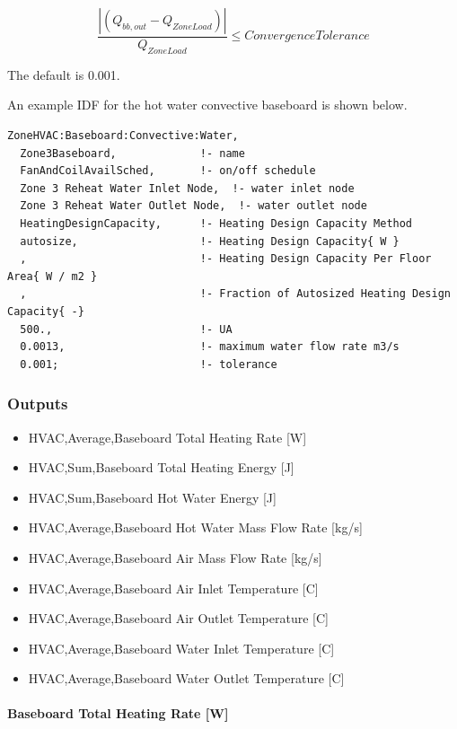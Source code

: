 \begin{equation}
\frac{{\left| {({Q_{bb,out}} - {Q_{ZoneLoad}})} \right|}}{{{Q_{ZoneLoad}}}} \le Convergence Tolerance
\end{equation}

The default is 0.001.

An example IDF for the hot water convective baseboard is shown below.

\begin{lstlisting}
ZoneHVAC:Baseboard:Convective:Water,
  Zone3Baseboard,             !- name
  FanAndCoilAvailSched,       !- on/off schedule
  Zone 3 Reheat Water Inlet Node,  !- water inlet node
  Zone 3 Reheat Water Outlet Node,  !- water outlet node
  HeatingDesignCapacity,      !- Heating Design Capacity Method
  autosize,                   !- Heating Design Capacity{ W }
  ,                           !- Heating Design Capacity Per Floor Area{ W / m2 }
  ,                           !- Fraction of Autosized Heating Design Capacity{ -}
  500.,                       !- UA
  0.0013,                     !- maximum water flow rate m3/s
  0.001;                      !- tolerance
\end{lstlisting}

\subsubsection{Outputs}\label{outputs-3-015}

\begin{itemize}
\item
  HVAC,Average,Baseboard Total Heating Rate {[}W{]}
\item
  HVAC,Sum,Baseboard Total Heating Energy {[}J{]}
\item
  HVAC,Sum,Baseboard Hot Water Energy {[}J{]}
\item
  HVAC,Average,Baseboard Hot Water Mass Flow Rate {[}kg/s{]}
\item
  HVAC,Average,Baseboard Air Mass Flow Rate {[}kg/s{]}
\item
  HVAC,Average,Baseboard Air Inlet Temperature {[}C{]}
\item
  HVAC,Average,Baseboard Air Outlet Temperature {[}C{]}
\item
  HVAC,Average,Baseboard Water Inlet Temperature {[}C{]}
\item
  HVAC,Average,Baseboard Water Outlet Temperature {[}C{]}
\end{itemize}

\paragraph{Baseboard Total Heating Rate {[}W{]}}\label{baseboard-total-heating-rate-w-3}

